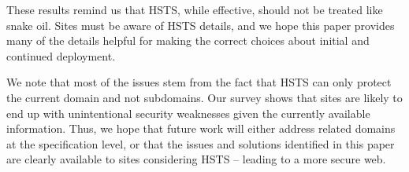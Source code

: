 \documentclass{acm_proc_article-sp}
\begin{document}
These results remind us that HSTS, while effective, should not be treated like snake oil. Sites must be aware of HSTS details, and we hope this paper provides many of the details helpful for making the correct choices about initial and continued deployment.

We note that most of the issues stem from the fact that HSTS can only protect the current domain and not subdomains. Our survey shows that sites are likely to end up with unintentional security weaknesses given the currently available information. Thus, we hope that future work will either address related domains at the specification level, or that the issues and solutions identified in this paper are clearly available to sites considering HSTS -- leading to a more secure web.


\end{document}
